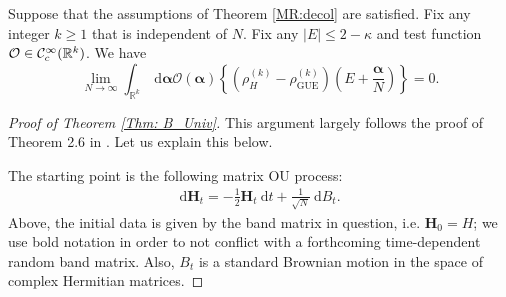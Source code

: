  \begin{theorem}\label{Thm: B_Univ}Suppose that the assumptions of Theorem \ref{MR:decol} are satisfied. Fix any integer $k\geq1$ that is independent of $N$. Fix any $|E| \leq 2-\kappa$ and test function $\mathcal{O}\in\mathcal{C}^{\infty}_{c}(\mathbb{R}^{k})$. We have
 \begin{equation}\label{eq:universality}
\lim _{N \rightarrow \infty} \int_{\mathbb{R}^k} \mathrm{~d} \boldsymbol{\alpha} \mathcal{O}(\boldsymbol{\alpha})\left\{\left(\rho_H^{(k)}-\rho_{\mathrm{GUE}}^{(k)}\right)\left(E+\frac{\boldsymbol{\alpha}}{N}\right)\right\}=0.
 \end{equation}  
 \end{theorem}
 \begin{proof}[Proof of Theorem \ref{Thm: B_Univ}]
This argument largely follows the proof of Theorem 2.6 in \cite{YY_25}. Let us explain this below. 

The starting point is the following matrix OU process:
%
\begin{align*}
    \mathrm{d} {\mathbf{H}}_t=-\frac{1}{2} {\mathbf{H}}_t \mathrm{~d} t+\frac{1}{\sqrt{N}} \mathrm{~d} B_t.
\end{align*}
%
Above, the initial data is given by the band matrix in question, i.e. ${\mathbf{H}}_{0}=H$; we use bold notation in order to not conflict with a forthcoming time-dependent random band matrix. Also, $B_{t}$ is a standard Brownian motion in the space of complex Hermitian matrices.


\end{proof}
